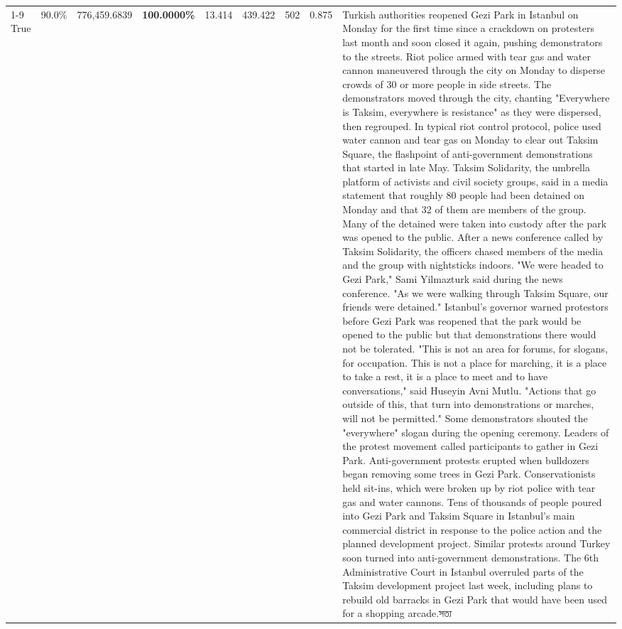 \begin{table}[H]
\begin{tabular}{lllrlllll}
\cline{1-9}
True & 90.0\% & 776,459.6839 & \bfseries \color{red} 100.0000\% & 13.414 & 439.422 & 502 & 0.875 & Turkish authorities reopened Gezi Park in Istanbul on Monday for the first time since a crackdown on protesters last month and soon closed it again, pushing demonstrators to the streets. Riot police armed with tear gas and water cannon maneuvered through the city on Monday to disperse crowds of 30 or more people in side streets. The demonstrators moved through the city, chanting "Everywhere is Taksim, everywhere is resistance" as they were dispersed, then regrouped. In typical riot control protocol, police used water cannon and tear gas on Monday to clear out Taksim Square, the flashpoint of anti-government demonstrations that started in late May. Taksim Solidarity, the umbrella platform of activists and civil society groups, said in a media statement that roughly 80 people had been detained on Monday and that 32 of them are members of the group. Many of the detained were taken into custody after the park was opened to the public. After a news conference called by Taksim Solidarity, the officers chased members of the media and the group with nightsticks indoors. "We were headed to Gezi Park," Sami Yilmazturk said during the news conference. "As we were walking through Taksim Square, our friends were detained." Istanbul's governor warned protestors before Gezi Park was reopened that the park would be opened to the public but that demonstrations there would not be tolerated. "This is not an area for forums, for slogans, for occupation. This is not a place for marching, it is a place to take a rest, it is a place to meet and to have conversations," said Huseyin Avni Mutlu. "Actions that go outside of this, that turn into demonstrations or marches, will not be permitted." Some demonstrators shouted the "everywhere" slogan during the opening ceremony. Leaders of the protest movement called participants to gather in Gezi Park. Anti-government protests erupted when bulldozers began removing some trees in Gezi Park. Conservationists held sit-ins, which were broken up by riot police with tear gas and water cannons. Tens of thousands of people poured into Gezi Park and Taksim Square in Istanbul's main commercial district in response to the police action and the planned development project. Similar protests around Turkey soon turned into anti-government demonstrations. The 6th Administrative Court in Istanbul overruled parts of the Taksim development project last week, including plans to rebuild old barracks in Gezi Park that would have been used for a shopping arcade.সত্য \\

\end{tabular}
\end{table}
